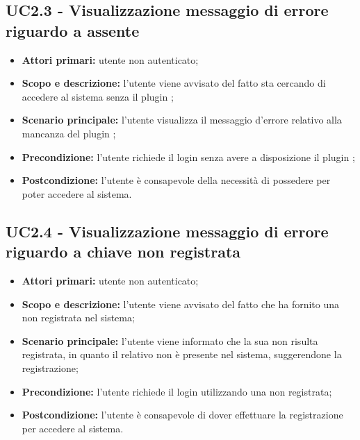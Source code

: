 \documentclass[AnalisiDeiRequisiti.tex]{subfiles}
\begin{document}
\subsection{UC2.3 - Visualizzazione messaggio di errore riguardo a  assente}
\begin{itemize}
	\item \textbf{Attori primari:} utente non autenticato;
	\item \textbf{Scopo e descrizione:} l'utente viene avvisato del fatto sta cercando di accedere al sistema senza il plugin ;
	\item \textbf{Scenario principale:} l'utente visualizza il messaggio d'errore relativo alla mancanza del plugin ;
	\item \textbf{Precondizione:} l'utente richiede il login senza avere a disposizione il plugin ;
	\item \textbf{Postcondizione:} l'utente è consapevole della necessità di possedere  per poter accedere al sistema.
\end{itemize}
\subsection{UC2.4 - Visualizzazione messaggio di errore riguardo a chiave non registrata}
\begin{itemize}
	\item \textbf{Attori primari:} utente non autenticato;
	\item \textbf{Scopo e descrizione:} l'utente viene avvisato del fatto che ha fornito una  non registrata nel sistema;
	\item \textbf{Scenario principale:} l'utente viene informato che la sua  non risulta registrata, in quanto il relativo  non è presente nel sistema, suggerendone la registrazione;
	\item \textbf{Precondizione:} l'utente richiede il login utilizzando una  non registrata;
	\item \textbf{Postcondizione:} l'utente è consapevole di dover effettuare la registrazione per accedere al sistema.
\end{itemize}
\end{document}
